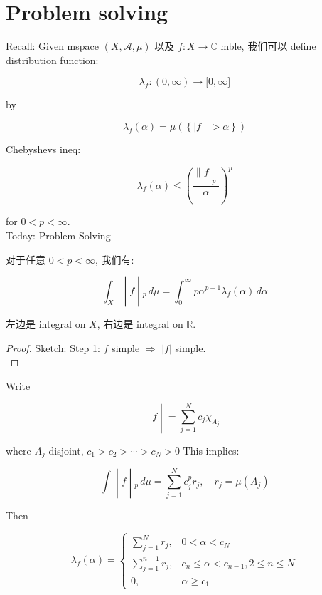\chapter{Problem solving}\label{problem-solving}

Recall: Given mspace \((X,\mathcal{A},\mu)\) 以及 \(f:X\rightarrow\mathbb{C}\) mble, 我们可以 define distribution function:

\[\lambda_{f}:(0,\infty)\rightarrow\lbrack 0,\infty\rbrack\]

by

\[\lambda_{f}(\alpha) = \mu(\left\{ |f \middle| > \alpha \right\})\]

Chebyshevs ineq:

\[\lambda_{f}(\alpha) \leq (\frac{\parallel f\underset{p}{\parallel}}{\alpha})^{p}\]

for \(0 < p < \infty\).\\
Today: Problem Solving

\begin{proposition}

对于任意 \(0 < p < \infty\), 我们有:

\[\left. \int_{X} \middle| f \middle| {}_{p}\, d\mu = \int_{0}^{\infty}p\alpha^{p - 1}\lambda_{f}(\alpha)\, d\alpha \right.\]

\end{proposition}

左边是 integral on \(X\), 右边是 integral on \(\mathbb{R}\).

\begin{proof}

Sketch: Step 1: \(f\) simple \(\Longrightarrow\) \(|f|\) simple.\\

\end{proof}

Write

\[\left. |f \middle| = \sum\limits_{j = 1}^{N}c_{j}\chi_{A_{j}} \right.\]

where \(A_{j}\) disjoint, \(c_{1} > c_{2} > \cdots > c_{N} > 0\) This implies:

\[\left. \int \middle| f \middle| {}_{p}\, d\mu = \sum\limits_{j = 1}^{N}c_{j}^{p}r_{j},\quad r_{j} = \mu(A_{j}) \right.\]

Then

\[\lambda_{f}(\alpha) = \left\{ \begin{matrix}
{\sum_{j = 1}^{N}r_{j},} & {0 < \alpha < c_{N}} \\
{\sum_{j = 1}^{n - 1}r_{j},} & {c_{n} \leq \alpha < c_{n - 1},2 \leq n \leq N} \\
{0,} & {\alpha \geq c_{1}}
\end{matrix} \right.\]

